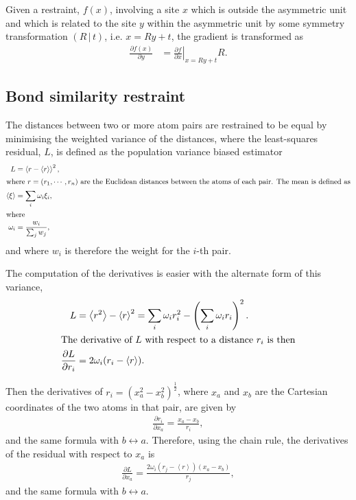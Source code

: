 \documentclass[pdf]{iucr}
\newcommand{\mean}[1]{\left\langle #1 \right\rangle}
\newcommand{\sym}[2]{\left( #1\,\vert\, #2 \right)}
\newcommand{\partialder}[2]{\frac{\partial #1}{\partial #2}}
\begin{document}
Given a restraint, $f(x)$, involving a site $x$ which is outside the asymmetric unit and which is related to the site $y$ within the asymmetric unit by some symmetry transformation $\sym{R}{t}$, i.e. $x=Ry+t$, the gradient is transformed as
\begin{align}
\partialder{f(x)}{y}  &= \left.\partialder{f}{x}\right|_{x=Ry+t} R.
\label{eqn:partialder:transform:under:symmetry}
\end{align}

\subsection{Bond similarity restraint}

The distances between two or more atom pairs are restrained to be equal by minimising the weighted variance of the distances, where the least-squares residual, $L$, is defined as the population variance biased estimator
\begin{align}
\label{eqn:bond_similarity}
L &= \mean{r - \mean{r}}^2,\\
\shortintertext{where $r=(r_1, \cdots, r_n)$ are the Euclidean distances between the atoms of each pair. The mean is defined as}
\mean{\xi} &= \sum_i \omega_i \xi_i, \\
\shortintertext{where}
\omega_i &= \frac{w_i}{\sum_j w_j},
\end{align}
and where $w_i$ is therefore the weight for the $i$-th pair.

The computation of the derivatives is easier with the alternate form of this variance, 
\begin{align}
L &= \mean{r^2} - \mean{r}^2 = \sum_i \omega_i r_i^2 - \left(\sum_i \omega_i r_i\right)^2.\\
\shortintertext{The derivative of $L$ with respect to a distance $r_i$ is then}
\partialder{L}{r_i} &= 2 \omega_i(r_i - \mean{r}).
\end{align}

Then the derivatives of $r_i = (x_a^2 - x_b^2)^\frac{1}{2}$, where $x_a$ and $x_b$ are the Cartesian coordinates of the two atoms in that pair, are given by
\begin{align}
\partialder{r_i}{x_a} = \frac{x_a - x_b}{r_i},
\end{align}
and the same formula with $b \leftrightarrow a$.
Therefore, using the chain rule, the derivatives of the residual with respect to $x_a$ is
\begin{align}
\partialder{L}{x_a} = \frac{2 \omega_i (r_j - \mean{r})(x_a - x_b)}{r_j},
\end{align}
and the same formula with $b \leftrightarrow a$.
\end{document}
